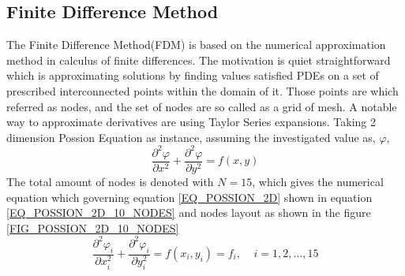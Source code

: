 \subsection{Finite Difference Method}\label{SEC:FDM}
The Finite Difference Method(FDM) is based on the numerical approximation method in calculus of finite differences.
The motivation is quiet straightforward which is approximating solutions by finding values satisfied PDEs on a set of 
prescribed interconnected points within the domain of it. Those points are which referred as nodes, and the set of nodes 
are so called as a grid of mesh.
A notable way to approximate derivatives are using 
Taylor Series expansions.
Taking 2 dimension Possion Equation as instance, assuming the investigated value as, $\varphi$,
\begin{equation}\label{EQ_POSSION_2D}
  \frac{
    \partial ^ 2 \varphi  
  }{
    \partial x ^ 2
  } +
  \frac{
    \partial ^ 2 \varphi  
  }{
    \partial y ^ 2
  }
  =  f(x,y)
\end{equation}
The total amount of nodes is denoted with $N = 15$, which gives the numerical equation which governing 
equation \ref{EQ_POSSION_2D} 
shown in 
equation \ref{EQ_POSSION_2D_10_NODES} and nodes layout as shown in the 
figure \ref{FIG_POSSION_2D_10_NODES}
\begin{equation}\label{EQ_POSSION_2D_10_NODES}
  \frac{
    \partial ^ 2 \varphi_i
  }{
    \partial x_i ^ 2
  } +
  \frac{
    \partial ^ 2 \varphi_i
  }{
    \partial y_i ^ 2
  }
  =  f(x_i,y_i) = f_i, \:\:\:\:\: i = 1,2,\dots,15
\end{equation}
